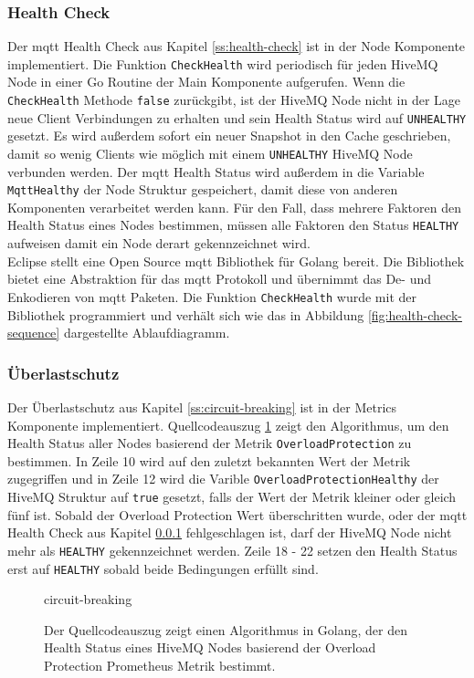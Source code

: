 \subsubsection{Health Check} \label{si:health-check}
Der \ac{mqtt} Health Check aus Kapitel \ref{ss:health-check} ist in der Node Komponente implementiert. Die Funktion \verb|CheckHealth| wird periodisch für jeden HiveMQ Node in einer Go Routine der Main Komponente aufgerufen. Wenn die \verb|CheckHealth| Methode \verb|false| zurückgibt, ist der HiveMQ Node nicht in der Lage neue Client Verbindungen zu erhalten und sein Health Status wird auf \verb|UNHEALTHY| gesetzt. Es wird au{\ss}erdem sofort ein neuer Snapshot in den Cache geschrieben, damit so wenig Clients wie möglich mit einem \verb|UNHEALTHY| HiveMQ Node verbunden werden. Der \ac{mqtt} Health Status wird au{\ss}erdem in die Variable \verb|MqttHealthy| der Node Struktur gespeichert, damit diese von anderen Komponenten verarbeitet werden kann. Für den Fall, dass mehrere Faktoren den Health Status eines Nodes bestimmen, müssen alle Faktoren den Status \verb|HEALTHY| aufweisen damit ein Node derart gekennzeichnet wird.
\\
Eclipse stellt eine Open Source \ac{mqtt} Bibliothek für Golang bereit.
\cite{EclipsePahoMqtt2021}
Die Bibliothek bietet eine Abstraktion für das \ac{mqtt} Protokoll und übernimmt das De- und Enkodieren von \ac{mqtt} Paketen. Die Funktion \verb|CheckHealth| wurde mit der Bibliothek programmiert und verhält sich wie das in Abbildung \ref{fig:health-check-sequence} dargestellte Ablaufdiagramm.

\subsubsection{Überlastschutz}
Der Überlastschutz aus Kapitel \ref{ss:circuit-breaking} ist in der Metrics Komponente implementiert. Quellcodeauszug \ref{code:circuit-breaking} zeigt den Algorithmus, um den Health Status aller Nodes basierend der Metrik \verb|OverloadProtection| zu bestimmen. In Zeile 10 wird auf den zuletzt bekannten Wert der Metrik zugegriffen und in Zeile 12 wird die Varible \verb|OverloadProtectionHealthy| der HiveMQ Struktur auf \verb|true| gesetzt, falls der Wert der Metrik kleiner oder gleich fünf ist.
Sobald der Overload Protection Wert überschritten wurde, oder der \ac{mqtt} Health Check aus Kapitel \ref{si:health-check} fehlgeschlagen ist, darf der HiveMQ Node nicht mehr als \verb|HEALTHY| gekennzeichnet werden. Zeile 18 - 22 setzen den Health Status erst auf \verb|HEALTHY| sobald beide Bedingungen erfüllt sind.
\begin{figure}
    {circuit-breaking}
    \caption{Der Quellcodeauszug zeigt einen Algorithmus in Golang, der den Health Status eines HiveMQ Nodes basierend der Overload Protection Prometheus Metrik bestimmt.}
    \label{code:circuit-breaking}
\end{figure}
\newpage

